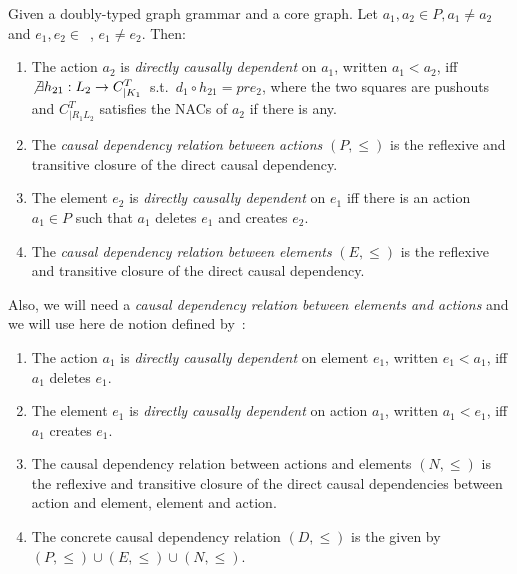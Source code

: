 \begin{definition} Given \doublyTypedGraphGrammarCore{} a doubly-typed graph grammar and \coreGraph{} a core graph. Let $a_1, a_2 \in P, a_1 \ne a_2$ and \mbox{$e_1, e_2 \in $ \coreGraph{},} $e_1 \ne e_2$. Then: 

  \begin{enumerate}
    \item The action $a_2$ is \emph{directly causally dependent} on $a_1$, written $a_1 < a_2$, iff \mbox{$\not\exists h_{21} : L_2 \rightarrow C^T_{|K_1}$ s.t. \mbox{$d_1 \circ h_{21} = pre_2$}}, where the two squares are pushouts and $C^T_{|R_1L_2}$ satisfies the NACs of $a_2$ if there is any.

   \item The \emph{causal dependency relation between actions} $(P, \leq)$ is the reflexive and transitive closure of the direct causal dependency.
     \item The element $e_2$ is \emph{directly causally dependent} on $e_1$ iff there is an action $a_1 \in P$ such that $a_1$ deletes $e_1$ and creates $e_2$.
    \item The \emph{causal dependency relation between elements} $(E, \leq)$ is the reflexive and transitive closure of the direct causal dependency.
  \end{enumerate}

  Also, we will need a \emph{causal dependency relation between elements and actions} and we will use here de notion defined by~\cite{Corradini1996}:

  \begin{enumerate}\addtocounter{enumi}{4}
    \item The action $a_1$ is \emph{directly causally dependent} on element $e_1$, written $e_1 < a_1$, iff $a_1$ deletes $e_1$. 
    \item The element $e_1$ is \emph{directly causally dependent} on action $a_1$, written $a_1 < e_1$, iff $a_1$ creates $e_1$.
    \item The causal dependency relation between actions and elements $(N, \leq)$ is the reflexive and transitive closure of the direct causal dependencies between action and element, element and action.
    \item The concrete causal dependency relation $(D, \leq)$ is the given by \mbox{$(P, \leq) \cup (E, \leq) \cup (N, \leq)$}.
  \end{enumerate}
\end{definition}


